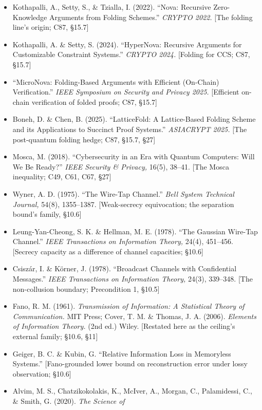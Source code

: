 \documentclass[
]{article}
\begin{document}
\begin{itemize}
\item
  Kothapalli, A., Setty, S., \& Tzialla, I. (2022). ``Nova: Recursive
  Zero-Knowledge Arguments from Folding Schemes.'' \emph{CRYPTO 2022.}
  {[}The folding line's origin; C87, §15.7{]}
\item
  Kothapalli, A. \& Setty, S. (2024). ``HyperNova: Recursive Arguments
  for Customizable Constraint Systems.'' \emph{CRYPTO 2024.} {[}Folding
  for CCS; C87, §15.7{]}
\item
  ``MicroNova: Folding-Based Arguments with Efficient (On-Chain)
  Verification.'' \emph{IEEE Symposium on Security and Privacy 2025.}
  {[}Efficient on-chain verification of folded proofs; C87, §15.7{]}
\item
  Boneh, D. \& Chen, B. (2025). ``LatticeFold: A Lattice-Based Folding
  Scheme and its Applications to Succinct Proof Systems.''
  \emph{ASIACRYPT 2025.} {[}The post-quantum folding hedge; C87, §15.7,
  §27{]}
\item
  Mosca, M. (2018). ``Cybersecurity in an Era with Quantum Computers:
  Will We Be Ready?'' \emph{IEEE Security \& Privacy,} 16(5), 38--41.
  {[}The Mosca inequality; C49, C61, C67, §27{]}
\item
  Wyner, A. D. (1975). ``The Wire-Tap Channel.'' \emph{Bell System
  Technical Journal,} 54(8), 1355--1387. {[}Weak-secrecy equivocation;
  the separation bound's family, §10.6{]}
\item
  Leung-Yan-Cheong, S. K. \& Hellman, M. E. (1978). ``The Gaussian
  Wire-Tap Channel.'' \emph{IEEE Transactions on Information Theory,}
  24(4), 451--456. {[}Secrecy capacity as a difference of channel
  capacities; §10.6{]}
\item
  Csiszár, I. \& Körner, J. (1978). ``Broadcast Channels with
  Confidential Messages.'' \emph{IEEE Transactions on Information
  Theory,} 24(3), 339--348. {[}The non-collusion boundary; Precondition
  1, §10.5{]}
\item
  Fano, R. M. (1961). \emph{Transmission of Information: A Statistical
  Theory of Communication.} MIT Press; Cover, T. M. \& Thomas, J. A.
  (2006). \emph{Elements of Information Theory.} (2nd ed.) Wiley.
  {[}Restated here as the ceiling's external family; §10.6, §11{]}
\item
  Geiger, B. C. \& Kubin, G. ``Relative Information Loss in Memoryless
  Systems.'' {[}Fano-grounded lower bound on reconstruction error under
  lossy observation; §10.6{]}
\item
  Alvim, M. S., Chatzikokolakis, K., McIver, A., Morgan, C.,
  Palamidessi, C., \& Smith, G. (2020). \emph{The Science of
}
\end{itemize}
\end{document}
